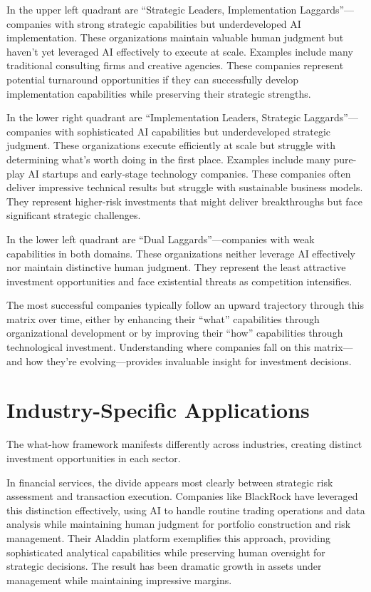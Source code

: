 \documentclass[
  Letterpaper,
]{scrbook}
\begin{document}
In the upper left quadrant are ``Strategic Leaders, Implementation
Laggards''---companies with strong strategic capabilities but
underdeveloped AI implementation. These organizations maintain valuable
human judgment but haven't yet leveraged AI effectively to execute at
scale. Examples include many traditional consulting firms and creative
agencies. These companies represent potential turnaround opportunities
if they can successfully develop implementation capabilities while
preserving their strategic strengths.

In the lower right quadrant are ``Implementation Leaders, Strategic
Laggards''---companies with sophisticated AI capabilities but
underdeveloped strategic judgment. These organizations execute
efficiently at scale but struggle with determining what's worth doing in
the first place. Examples include many pure-play AI startups and
early-stage technology companies. These companies often deliver
impressive technical results but struggle with sustainable business
models. They represent higher-risk investments that might deliver
breakthroughs but face significant strategic challenges.

In the lower left quadrant are ``Dual Laggards''---companies with weak
capabilities in both domains. These organizations neither leverage AI
effectively nor maintain distinctive human judgment. They represent the
least attractive investment opportunities and face existential threats
as competition intensifies.

The most successful companies typically follow an upward trajectory
through this matrix over time, either by enhancing their ``what''
capabilities through organizational development or by improving their
``how'' capabilities through technological investment. Understanding
where companies fall on this matrix---and how they're
evolving---provides invaluable insight for investment decisions.

\section{Industry-Specific
Applications}\label{industry-specific-applications}

The what-how framework manifests differently across industries, creating
distinct investment opportunities in each sector.

In financial services, the divide appears most clearly between strategic
risk assessment and transaction execution. Companies like BlackRock have
leveraged this distinction effectively, using AI to handle routine
trading operations and data analysis while maintaining human judgment
for portfolio construction and risk management. Their Aladdin platform
exemplifies this approach, providing sophisticated analytical
capabilities while preserving human oversight for strategic decisions.
The result has been dramatic growth in assets under management while
maintaining impressive margins.
\end{document}
